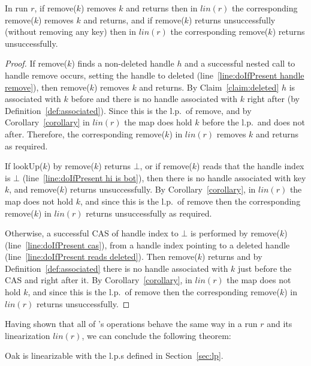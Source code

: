 \begin{claim}[Remove]
In run $r$, if remove($k$) removes $k$ and returns then in $lin(r)$ the corresponding remove($k$) removes $k$ and returns, and if remove($k$) returns unsuccessfully (without removing any key) then in $lin(r)$ the corresponding remove($k$) returns unsuccessfully.
\end{claim}

\begin{proof}
If remove($k$) finds a non-deleted handle $h$ and a successful nested call to handle remove occurs, setting the handle to deleted (line~\ref{line:doIfPresent handle remove}), then remove($k$) removes $k$ and returns.
By Claim~\ref{claim:deleted} $h$ is associated with $k$ before and there is no handle associated with $k$ right after (by Definition~\ref{def:associated}).
Since this is the l.p.\ of remove, and by Corollary~\ref{corollary} in $lin(r)$ the map does hold $k$ before the l.p.\ and does not after.
Therefore, the corresponding remove($k$) in $lin(r)$ removes $k$ and returns as required.

If lookUp($k$) by remove($k$) returns $\bot$, or if remove($k$) reads that the handle index is $\bot$ (line~\ref{line:doIfPresent hi is bot}), then there is no handle associated with key $k$, and remove($k$) returns unsuccessfully.
By Corollary~\ref{corollary}, in $lin(r)$ the map does not hold $k$, and since this is the l.p.\ of remove then the corresponding remove($k$) in $lin(r)$ returns unsuccessfully as required.

Otherwise, a successful CAS of handle index to $\bot$ is performed by remove($k$) (line~\ref{line:doIfPresent cas}), from a handle index pointing to a deleted handle (line~\ref{line:doIfPresent reads deleted}).
Then remove($k$) returns and by Definition~\ref{def:associated} there is no handle associated with $k$ just before the CAS and right after it. 
By Corollary~\ref{corollary}, in $lin(r)$ the map does not hold $k$, and since this is the l.p.\ of remove then the corresponding remove($k$) in $lin(r)$ returns unsuccessfully.
\end{proof}

Having shown that all of \oak's operations behave the same way in a run $r$ and its linearization $lin(r)$, we can conclude the following theorem:

\begin{theorem}
Oak is linearizable with the l.p.s defined in Section~\ref{sec:lp}.
\end{theorem}